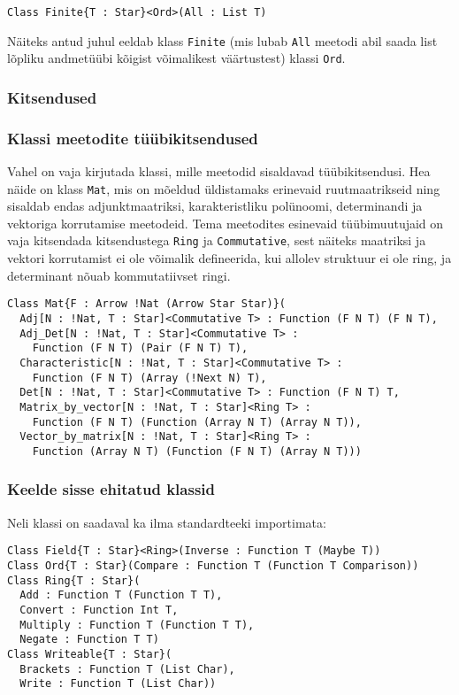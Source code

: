 \documentclass[12pt]{article}
\begin{document}
        \begin{verbatim}Class Finite{T : Star}<Ord>(All : List T)\end{verbatim}

        Näiteks antud juhul eeldab klass \verb!Finite! (mis lubab \verb!All! meetodi abil saada list lõpliku andmetüübi kõigist võimalikest väärtustest) klassi \verb!Ord!.
      \subsubsection{Kitsendused}
        
      \subsubsection{Klassi meetodite tüübikitsendused}
        Vahel on vaja kirjutada klassi, mille meetodid sisaldavad tüübikitsendusi. Hea näide on klass \verb!Mat!, mis on mõeldud üldistamaks erinevaid ruutmaatrikseid ning sisaldab endas adjunktmaatriksi, karakteristliku polünoomi, determinandi ja vektoriga korrutamise meetodeid. Tema meetodites esinevaid tüübimuutujaid on vaja kitsendada kitsendustega \verb!Ring! ja \verb!Commutative!, sest näiteks maatriksi ja vektori korrutamist ei ole võimalik defineerida, kui allolev struktuur ei ole ring, ja determinant nõuab kommutatiivset ringi.

        \begin{verbatim}Class Mat{F : Arrow !Nat (Arrow Star Star)}(
  Adj[N : !Nat, T : Star]<Commutative T> : Function (F N T) (F N T),
  Adj_Det[N : !Nat, T : Star]<Commutative T> :
    Function (F N T) (Pair (F N T) T),
  Characteristic[N : !Nat, T : Star]<Commutative T> :
    Function (F N T) (Array (!Next N) T),
  Det[N : !Nat, T : Star]<Commutative T> : Function (F N T) T,
  Matrix_by_vector[N : !Nat, T : Star]<Ring T> :
    Function (F N T) (Function (Array N T) (Array N T)),
  Vector_by_matrix[N : !Nat, T : Star]<Ring T> :
    Function (Array N T) (Function (F N T) (Array N T)))\end{verbatim}
      \subsubsection{Keelde sisse ehitatud klassid}
        Neli klassi on saadaval ka ilma standardteeki importimata:

        \begin{verbatim}Class Field{T : Star}<Ring>(Inverse : Function T (Maybe T))
Class Ord{T : Star}(Compare : Function T (Function T Comparison))
Class Ring{T : Star}(
  Add : Function T (Function T T),
  Convert : Function Int T,
  Multiply : Function T (Function T T),
  Negate : Function T T)
Class Writeable{T : Star}(
  Brackets : Function T (List Char),
  Write : Function T (List Char))\end{verbatim}
\end{document}
